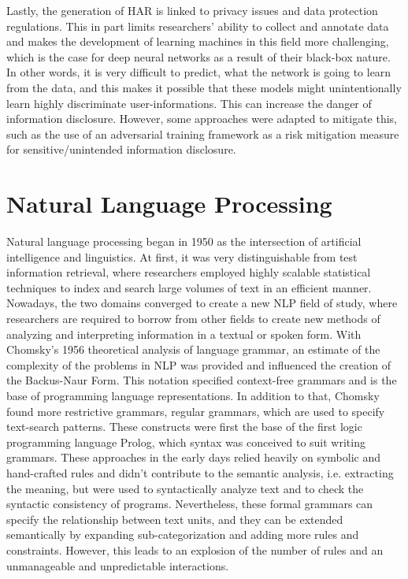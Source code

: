 		Lastly, the generation of HAR is linked to privacy issues and data protection regulations. This in part limits researchers' ability to collect and annotate data and makes the development of learning machines in this field more challenging, which is the case for deep neural networks as a result of their black-box nature. In other words, it is very difficult to predict, what the network is going to learn from the data, and this makes it possible that these models might unintentionally learn highly discriminate user-informations. This can increase the danger of information disclosure. However, some approaches were adapted to mitigate this, such as the use of an adversarial training framework as a risk mitigation measure for sensitive/unintended information disclosure\cite{iwasawa2017privacy}.
	\section{Natural Language Processing}\label{sec:nlp}
		Natural language processing began in 1950 as the intersection of artificial intelligence and linguistics. At first, it was very distinguishable from test information retrieval, where researchers employed highly scalable statistical techniques to index and search large volumes of text in an efficient manner\cite{nadkarni2011natural}. Nowadays, the two domains converged to create a new NLP field of study, where researchers are required to borrow from other fields to create new methods of analyzing and interpreting information in a textual or spoken form.\newline
		With Chomsky's 1956 theoretical analysis of language grammar, an estimate of the complexity of the problems in NLP was provided and influenced the creation of the Backus-Naur Form. This notation specified context-free grammars and is the base of programming language representations. In addition to that, Chomsky found more restrictive grammars, regular grammars, which are used to specify text-search patterns\cite{nadkarni2011natural}. These constructs were first the base of the first logic programming language Prolog, which syntax was conceived to suit writing grammars.\newline
		These approaches in the early days relied heavily on symbolic and hand-crafted rules and didn't contribute to the semantic analysis, i.e. extracting the meaning, but were used to syntactically analyze text and to check the syntactic consistency of programs. Nevertheless, these formal grammars can specify the relationship between text units, and they can be extended semantically by expanding sub-categorization and adding more rules and constraints. However, this leads to an explosion of the number of rules and an unmanageable and unpredictable interactions\cite{nadkarni2011natural}.\newline

